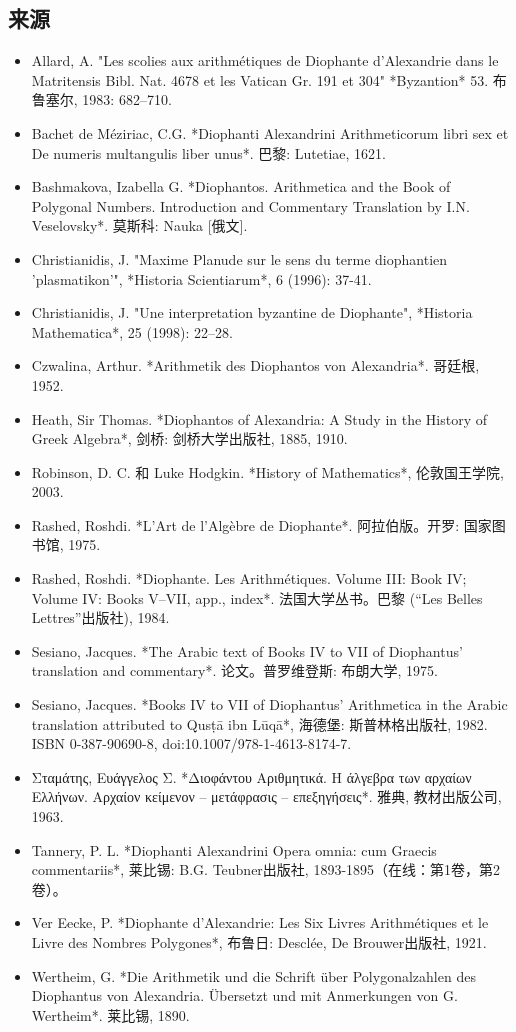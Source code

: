 \subsection{来源}
\begin{itemize}
\item Allard, A. "Les scolies aux arithmétiques de Diophante d'Alexandrie dans le Matritensis Bibl. Nat. 4678 et les Vatican Gr. 191 et 304" *Byzantion* 53. 布鲁塞尔, 1983: 682–710.  
\item Bachet de Méziriac, C.G. *Diophanti Alexandrini Arithmeticorum libri sex et De numeris multangulis liber unus*. 巴黎: Lutetiae, 1621.  
\item Bashmakova, Izabella G. *Diophantos. Arithmetica and the Book of Polygonal Numbers. Introduction and Commentary Translation by I.N. Veselovsky*. 莫斯科: Nauka [俄文].  
\item Christianidis, J. "Maxime Planude sur le sens du terme diophantien 'plasmatikon'", *Historia Scientiarum*, 6 (1996): 37-41.  
\item Christianidis, J. "Une interpretation byzantine de Diophante", *Historia Mathematica*, 25 (1998): 22–28.  
\item Czwalina, Arthur. *Arithmetik des Diophantos von Alexandria*. 哥廷根, 1952.  
\item Heath, Sir Thomas. *Diophantos of Alexandria: A Study in the History of Greek Algebra*, 剑桥: 剑桥大学出版社, 1885, 1910.  
\item Robinson, D. C. 和 Luke Hodgkin. *History of Mathematics*, 伦敦国王学院, 2003.  
\item Rashed, Roshdi. *L’Art de l’Algèbre de Diophante*. 阿拉伯版。开罗: 国家图书馆, 1975.  
\item Rashed, Roshdi. *Diophante. Les Arithmétiques. Volume III: Book IV; Volume IV: Books V–VII, app., index*. 法国大学丛书。巴黎 (“Les Belles Lettres”出版社), 1984.  
\item Sesiano, Jacques. *The Arabic text of Books IV to VII of Diophantus’ translation and commentary*. 论文。普罗维登斯: 布朗大学, 1975.  
\item Sesiano, Jacques. *Books IV to VII of Diophantus’ Arithmetica in the Arabic translation attributed to Qusṭā ibn Lūqā*, 海德堡: 斯普林格出版社, 1982. ISBN 0-387-90690-8, doi:10.1007/978-1-4613-8174-7.  
\item Σταμάτης, Ευάγγελος Σ. *Διοφάντου Αριθμητικά. Η άλγεβρα των αρχαίων Ελλήνων. Αρχαίον κείμενον – μετάφρασις – επεξηγήσεις*. 雅典, 教材出版公司, 1963.  
\item Tannery, P. L. *Diophanti Alexandrini Opera omnia: cum Graecis commentariis*, 莱比锡: B.G. Teubner出版社, 1893-1895（在线：第1卷，第2卷）。  
\item Ver Eecke, P. *Diophante d’Alexandrie: Les Six Livres Arithmétiques et le Livre des Nombres Polygones*, 布鲁日: Desclée, De Brouwer出版社, 1921.  
\item Wertheim, G. *Die Arithmetik und die Schrift über Polygonalzahlen des Diophantus von Alexandria. Übersetzt und mit Anmerkungen von G. Wertheim*. 莱比锡, 1890.
\end{itemize}
